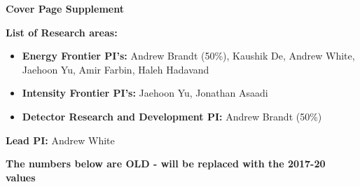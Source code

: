 \begin{center}
\noindent\textbf{\LARGE Cover Page Supplement}\newline
\end{center}

\noindent\textbf{List of Research areas:}
\begin{itemize}[noitemsep,nolistsep]
   \item \textbf{Energy Frontier PI's:} Andrew Brandt (50\%), Kaushik De, Andrew White, Jaehoon Yu, Amir Farbin, Haleh Hadavand
	\item \textbf{Intensity Frontier PI's:} Jaehoon Yu, Jonathan Asaadi
	\item \textbf{Detector Research and Development PI:} Andrew Brandt (50\%)
\end{itemize}

\noindent\textbf{Lead PI:} Andrew White
\vspace*{0.15in}

\textbf{\LARGE The numbers below are OLD - will be replaced with the 2017-20 values}
\vspace*{0.15in}

